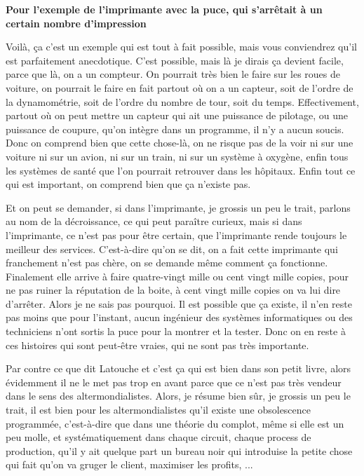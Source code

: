 \begin{small}
\vspace{1\baselineskip}

\textbf{Pour l'exemple de l'imprimante avec la puce, qui s'arrêtait à un certain nombre d'impression}

\vspace{1\baselineskip}

Voilà, ça c'est un exemple qui est tout à fait possible, mais vous conviendrez qu'il est parfaitement anecdotique. C'est possible, mais là je dirais ça devient facile, parce que là, on a un compteur. On pourrait très bien le faire sur les roues de voiture, on pourrait le faire en fait partout où on a un capteur, soit de l'ordre de la dynamométrie, soit de l'ordre du nombre de tour, soit du temps. Effectivement, partout où on peut mettre un capteur qui ait une puissance de pilotage, ou une puissance de coupure, qu'on intègre dans un programme, il n'y a aucun soucis. Donc on comprend bien que cette chose-là, on ne risque pas de la voir ni sur une voiture ni sur un avion, ni sur un train, ni sur un système à oxygène, enfin tous les systèmes de santé que l'on pourrait retrouver dans les hôpitaux. Enfin tout ce qui est important, on comprend bien que ça n'existe pas.

Et on peut se demander, si dans l'imprimante, je grossis un peu le trait, parlons au nom de la décroissance, ce qui peut paraître curieux, mais si dans l'imprimante, ce n'est pas pour être certain, que l'imprimante rende toujours le meilleur des services. C'est-à-dire qu'on se dit, on a fait cette imprimante qui franchement n'est pas chère, on se demande même comment ça fonctionne. Finalement elle arrive à faire quatre-vingt mille ou cent vingt mille copies, pour ne pas ruiner la réputation de la boite, à cent vingt mille copies on va lui dire d'arrêter. Alors je ne sais pas pourquoi. Il est possible que ça existe, il n'en reste pas moins que pour l'instant, aucun ingénieur des systèmes informatiques ou des techniciens n'ont sortis la puce pour la montrer et la tester. Donc on en reste à ces histoires qui sont peut-être vraies, qui ne sont pas très importante. 

\smallbreak
Par contre ce que dit Latouche et c'est ça qui est bien dans son petit livre, alors évidemment il ne le met pas trop en avant parce que ce n’est pas très vendeur dans le sens des altermondialistes. Alors, je résume bien sûr, je grossis un peu le trait, il est bien pour les altermondialistes qu'il existe une obsolescence programmée, c'est-à-dire que dans une théorie du complot, même si elle est un peu molle, et systématiquement dans chaque circuit, chaque process de production, qu'il y ait quelque part un bureau noir qui introduise la petite chose qui fait qu'on va gruger le client, maximiser les profits, ... 


\end{small}
